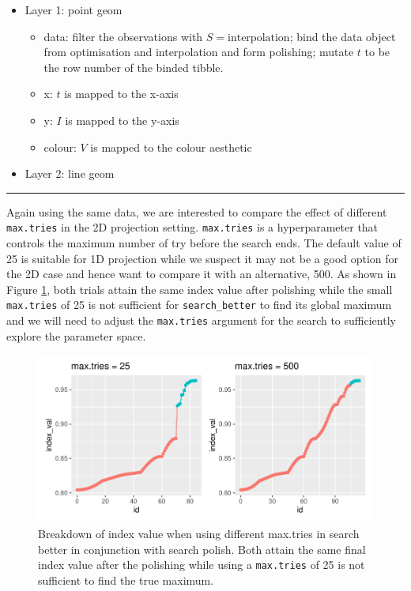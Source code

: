 \documentclass[12pt]{article}
\providecommand{\tightlist}{%
  \setlength{\itemsep}{0pt}\setlength{\parskip}{0pt}}
\begin{document}
\begin{itemize}
\tightlist
\item
  Layer 1: point geom

  \begin{itemize}
  \tightlist
  \item
    data: filter the observations with \(S = \text{interpolation}\);
    bind the data object from optimisation and interpolation and form
    polishing; mutate \(t\) to be the row number of the binded tibble.
  \item
    x: \(t\) is mapped to the x-axis
  \item
    y: \(I\) is mapped to the y-axis
  \item
    colour: \(V\) is mapped to the colour aesthetic
  \end{itemize}
\item
  Layer 2: line geom
\end{itemize}

\begin{center}\rule{0.5\linewidth}{0.5pt}\end{center}

Again using the same data, we are interested to compare the effect of
different \texttt{max.tries} in the 2D projection setting.
\texttt{max.tries} is a hyperparameter that controls the maximum number
of try before the search ends. The default value of 25 is suitable for
1D projection while we suspect it may not be a good option for the 2D
case and hence want to compare it with an alternative, 500. As shown in
Figure \ref{trace-compare}, both trials attain the same index value
after polishing while the small \texttt{max.tries} of 25 is not
sufficient for \texttt{search\_better} to find its global maximum and we
will need to adjust the \texttt{max.tries} argument for the search to
sufficiently explore the parameter space.

\begin{figure}
\centering
\includegraphics{paper_files/figure-latex/polish-1.pdf}
\caption{\label{trace-compare}Breakdown of index value when using
different max.tries in search better in conjunction with search polish.
Both attain the same final index value after the polishing while using a
\texttt{max.tries} of 25 is not sufficient to find the true maximum.}
\end{figure}
\end{document}
